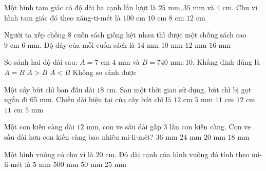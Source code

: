 \begin{ex} %
Một hình tam giác có độ dài ba cạnh lần lượt là $25\text{ mm}, 35\text{ mm}$ và $4\text{ cm}$. Chu vi hình tam giác đó theo xăng-ti-mét là
\choice
{$100\text{ cm}$}
{\True $10\text{ cm}$}
{$8\text{ cm}$}
{$12\text{ cm}$}
\end{ex}

\begin{ex} %
Người ta xếp chồng 8 cuốn sách giống hệt nhau thì được một chồng sách cao $9\text{ cm } 6\text{ mm}$. Độ dày của mỗi cuốn sách là
\choice
{$14\text{ mm}$}
{$10\text{ mm}$}
{\True $12\text{ mm}$}
{$16\text{ mm}$}
\end{ex}

\begin{ex} %
So sánh hai độ dài sau: $A = 7\text{ cm } 4\text{ mm}$ và $B = 740\text{ mm} : 10$. Khẳng định đúng là
\choice
{\True $A = B$}
{$A > B$}
{$A < B$}
{Không so sánh được}
\end{ex}

\begin{ex} %
Một cây bút chì ban đầu dài $18\text{ cm}$. Sau một thời gian sử dụng, bút chì bị gọt ngắn đi $65\text{ mm}$. Chiều dài hiện tại của cây bút chì là
\choice
{$12\text{ cm } 5\text{ mm}$}
{$11\text{ cm}$}
{$12\text{ cm}$}
{\True $11\text{ cm } 5\text{ mm}$}
\end{ex}

\begin{ex} %
Một con kiến càng dài $12\text{ mm}$, con ve sầu dài gấp 3 lần con kiến càng. Con ve sầu dài hơn con kiến càng bao nhiêu mi-li-mét?
\choice
{$36\text{ mm}$}
{\True $24\text{ mm}$}
{$20\text{ mm}$}
{$18\text{ mm}$}
\end{ex}

\begin{ex} %
Một hình vuông có chu vi là $20\text{ cm}$. Độ dài cạnh của hình vuông đó tính theo mi-li-mét là
\choice
{$5\text{ mm}$}
{$500\text{ mm}$}
{\True $50\text{ mm}$}
{$25\text{ mm}$}
\end{ex}

